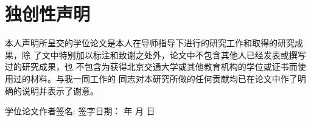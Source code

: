 \chapter*{独创性声明}

本人声明所呈交的学位论文是本人在导师指导下进行的研究工作和取得的研究成果，除
了文中特别加以标注和致谢之处外，论文中不包含其他人已经发表或撰写过的研究成果，也
不包含为获得北京交通大学或其他教育机构的学位或证书而使用过的材料。与我一同工作的
同志对本研究所做的任何贡献均已在论文中作了明确的说明并表示了谢意。
\vspace{2cm}

{ 学位论文作者签名:\hspace{2cm} 签字日期：\hspace{1.5cm} 年\hspace{1cm} 月\hspace{1cm} 日}

